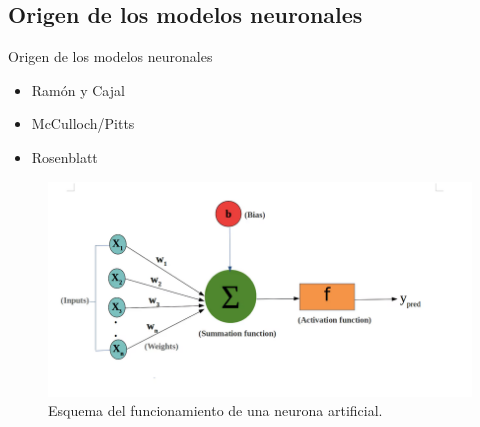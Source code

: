 \subsection{Origen de los modelos neuronales}
\begin{frame}{Origen de los modelos neuronales}
	\begin{itemize}
      	\item Ramón y Cajal
      	\item McCulloch/Pitts
      	\item Rosenblatt
    \end{itemize}
    
    \begin{figure}
    \centering
		    \includegraphics[width=\linewidth]{../Memoria/img/modelo/neuronaartificial.png}
		    \caption{Esquema del funcionamiento de una neurona artificial.}
		    \label{fig:neu-art}
    \end{figure}
      
%	    
%	        
	
\end{frame}



